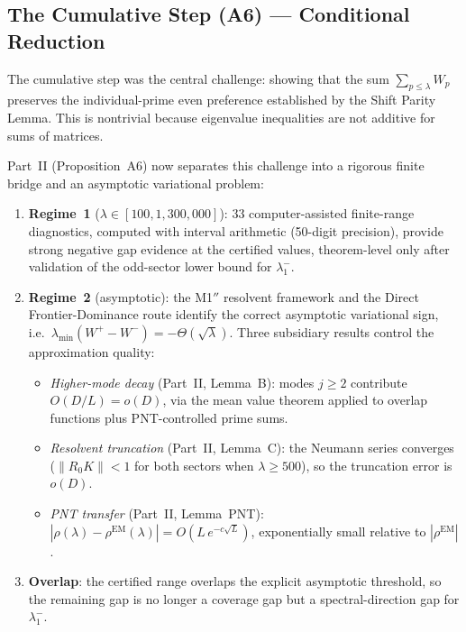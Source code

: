 \documentclass[12pt,a4paper]{article}
\theoremstyle{definition}
\theoremstyle{remark}
\begin{document}
\subsection{The Cumulative Step (A6) --- Conditional Reduction}

The cumulative step was the central challenge: showing that the sum $\sum_{p \leq \lambda} W_p$ preserves the individual-prime even preference established by the Shift Parity Lemma. This is nontrivial because eigenvalue inequalities are not additive for sums of matrices.

Part~II (Proposition~A6) now separates this challenge into a rigorous finite
bridge and an asymptotic variational problem:

\begin{enumerate}
  \item \textbf{Regime~1} ($\lambda \in [100, 1{,}300{,}000]$): $33$
    computer-assisted finite-range diagnostics, computed with interval
    arithmetic (50-digit precision), provide strong negative gap evidence at
    the certified values, theorem-level only after validation of the
    odd-sector lower bound for $\lambda_1^-$.
  \item \textbf{Regime~2} (asymptotic): the M1$''$ resolvent framework and
    the Direct Frontier-Dominance route identify the correct asymptotic
    variational sign, i.e.\ $\lambda_{\min}(W^+-W^-)=-\Theta(\sqrt\lambda)$.
    Three subsidiary results control the approximation quality:
  \begin{itemize}
    \item \emph{Higher-mode decay} (Part~II, Lemma~B): modes $j \geq 2$ contribute $O(D/L) = o(D)$, via the mean value theorem applied to overlap functions plus PNT-controlled prime sums.
    \item \emph{Resolvent truncation} (Part~II, Lemma~C): the Neumann series converges ($\|R_0 K\| < 1$ for both sectors when $\lambda \geq 500$), so the truncation error is $o(D)$.
    \item \emph{PNT transfer} (Part~II, Lemma~PNT): $|\rho(\lambda) - \rho^{\mathrm{EM}}(\lambda)| = O(L\,e^{-c\sqrt{L}})$, exponentially small relative to $|\rho^{\mathrm{EM}}|$.
  \end{itemize}
  \item \textbf{Overlap}: the certified range overlaps the explicit
    asymptotic threshold, so the remaining gap is no longer a coverage gap
    but a spectral-direction gap for $\lambda_1^-$.
\end{enumerate}
\end{document}
